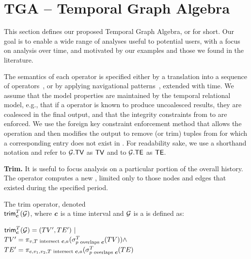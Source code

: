 \section{TGA -- Temporal Graph Algebra}
\label{sec:algebra}

This section defines our proposed Temporal Graph Algebra, or \tga for
short.  Our goal is to enable a wide range of analyses useful to
potential users, with a focus on analysis over time, and motivated by
our examples and those we found in the literature.

The semantics of each operator is specified either by a translation
into a sequence of \tra operators~\cite{Dignos2012}, or by applying
navigational patterns~\cite{DBLP:journals/corr/AnglesABHRV16},
extended with time.  We assume that the model properties are
maintained by the temporal relational model, e.g., that if a \tra
operator is known to produce uncoalesced results, they are coalesced
in the final output, and that the integrity constraints from \te to
\tv are enforced.  We use the foreign key constraint enforcement
method that allows the operation and then modifies the output to
remove (or trim) tuples from \te for which a corresponding entry does
not exist in \tv.  For readability sake, we use a shorthand notation
and refer to $\mathcal{G}.\textsf{TV}$ as $\textsf{TV}$ and to $\mathcal{G}.\textsf{TE}$ as $\textsf{TE}$.

{\bf Trim.}  It is useful to focus analysis on a particular portion of
the overall \tg history.  The  operator computes a new
\tg, limited only to those nodes and edges that existed during the
specified period.

\begin{definition}[Trim]
\label{def:slice}
The trim operator, denoted \\$\textsf{trim}^T_{\boldsymbol{c}}(\mathcal{G})$, where
$\boldsymbol{c}$ is a time interval and $\mathcal{G}$ is a \tg is defined as:

$\textsf{trim}^T_{\boldsymbol{c}}(\mathcal{G}) = (TV', TE') ~|~$\\ $TV' = \pi_{v,T \text{ intersect } \boldsymbol{c},a}(\sigma^T_{p \text{ overlaps } \boldsymbol{c}}(TV)) \land$ \\ $TE' = \pi_{e,v_1,v_2,T \text{ intersect } \boldsymbol{c},a}(\sigma^T_{p \text{ overlaps } \boldsymbol{c}}(TE)$
\end{definition}

